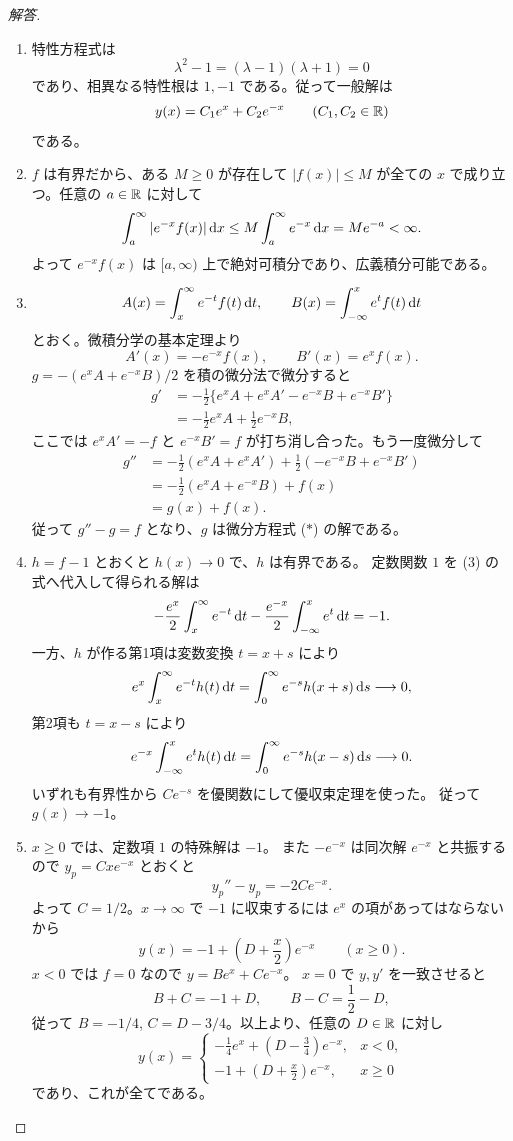 \begin{proof}[解答]
\begin{enumerate}
  \item[(1)] 特性方程式は
  \[
  \lambda^2-1=(\lambda-1)(\lambda+1)=0
  \]
  であり、相異なる特性根は $1,-1$ である。従って一般解は
  \[
  y(x)=C_1e^x+C_2e^{-x}\qquad(C_1,C_2\in\mathbb{R})
  \]
  である。
  \item[(2)] $f$ は有界だから、ある $M\ge0$ が存在して
  $|f(x)|\le M$ が全ての $x$ で成り立つ。任意の $a\in\mathbb{R}$ に対して
  \[
  \int_a^\infty|e^{-x}f(x)|\,\mathrm{d} x
  \le M\int_a^\infty e^{-x}\,\mathrm{d} x
  =Me^{-a}<\infty.
  \]
  よって $e^{-x}f(x)$ は $[a,\infty)$ 上で絶対可積分であり、広義積分可能である。
  \item[(3)]
  \[
  A(x)=\int_x^\infty e^{-t}f(t)\,\mathrm{d} t,\qquad
  B(x)=\int_{-\infty}^x e^tf(t)\,\mathrm{d} t
  \]
  とおく。微積分学の基本定理より
  \[
  A'(x)=-e^{-x}f(x),\qquad B'(x)=e^xf(x).
  \]
  $g=-(e^xA+e^{-x}B)/2$ を積の微分法で微分すると
  \begin{align*}
  g'
  &=-\frac12\{e^xA+e^xA'-e^{-x}B+e^{-x}B'\}\\
  &=-\frac12e^xA+\frac12e^{-x}B,
  \end{align*}
  ここでは $e^xA'=-f$ と $e^{-x}B'=f$ が打ち消し合った。もう一度微分して
  \begin{align*}
  g''
  &=-\frac12(e^xA+e^xA')
    +\frac12(-e^{-x}B+e^{-x}B')\\
  &=-\frac12(e^xA+e^{-x}B)+f(x)\\
  &=g(x)+f(x).
  \end{align*}
  従って $g''-g=f$ となり、$g$ は微分方程式 ($*$) の解である。
  \item[(4)] $h=f-1$ とおくと $h(x)\to0$ で、$h$ は有界である。
  定数関数 $1$ を (3) の式へ代入して得られる解は
  \[
  -\frac{e^x}{2}\int_x^\infty e^{-t}\,\mathrm{d} t
  -\frac{e^{-x}}2\int_{-\infty}^x e^t\,\mathrm{d} t=-1.
  \]
  一方、$h$ が作る第1項は変数変換 $t=x+s$ により
  \[
  e^x\int_x^\infty e^{-t}h(t)\,\mathrm{d} t
  =\int_0^\infty e^{-s}h(x+s)\,\mathrm{d} s\longrightarrow0,
  \]
  第2項も $t=x-s$ により
  \[
  e^{-x}\int_{-\infty}^x e^th(t)\,\mathrm{d} t
  =\int_0^\infty e^{-s}h(x-s)\,\mathrm{d} s\longrightarrow0.
  \]
  いずれも有界性から $Ce^{-s}$ を優関数にして優収束定理を使った。
  従って $g(x)\to-1$。
  \item[(5)] $x\ge0$ では、定数項 $1$ の特殊解は $-1$。
  また $-e^{-x}$ は同次解 $e^{-x}$ と共振するので
  $y_p=Cxe^{-x}$ とおくと
  \[
  y_p''-y_p=-2Ce^{-x}.
  \]
  よって $C=1/2$。$x\to\infty$ で $-1$ に収束するには $e^x$ の項があってはならないから
  \[
  y(x)=-1+\left(D+\frac x2\right)e^{-x}\qquad(x\ge0).
  \]
  $x<0$ では $f=0$ なので $y=Be^x+Ce^{-x}$。
  $x=0$ で $y,y'$ を一致させると
  \[
  B+C=-1+D,\qquad B-C=\frac12-D,
  \]
  従って $B=-1/4$, $C=D-3/4$。以上より、任意の $D\in\mathbb{R}$ に対し
  \[
  y(x)=\begin{cases}
  -\frac14e^x+(D-\frac34)e^{-x},&x<0,\\
  -1+(D+\frac x2)e^{-x},&x\ge0
  \end{cases}
  \]
  であり、これが全てである。
\end{enumerate}
\end{proof}


